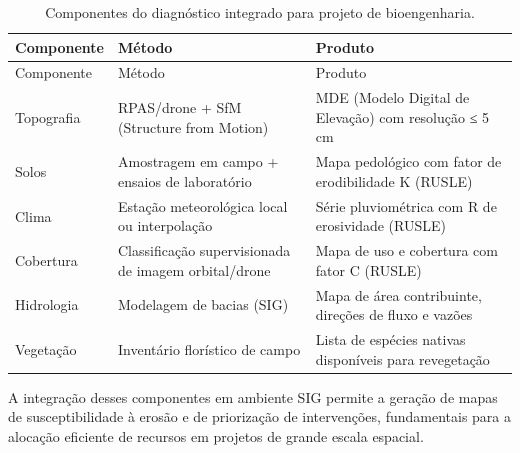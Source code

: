 \documentclass[
  portuguese,
  11pt,
  a4paper,
  open=any]{scrbook}
\begin{document}
\begin{longtable}[]{@{}
  >{\raggedright\arraybackslash}p{}
  >{\raggedright\arraybackslash}p{}
  >{\raggedright\arraybackslash}p{}@{}}
\caption{Componentes do diagnóstico integrado para projeto de
bioengenharia.}\label{tbl-diagnostico}\tabularnewline
\toprule\noalign{}
\begin{minipage}[b]{\linewidth}\raggedright
Componente
\end{minipage} & \begin{minipage}[b]{\linewidth}\raggedright
Método
\end{minipage} & \begin{minipage}[b]{\linewidth}\raggedright
Produto
\end{minipage} \\
\midrule\noalign{}
\endfirsthead
\toprule\noalign{}
\begin{minipage}[b]{\linewidth}\raggedright
Componente
\end{minipage} & \begin{minipage}[b]{\linewidth}\raggedright
Método
\end{minipage} & \begin{minipage}[b]{\linewidth}\raggedright
Produto
\end{minipage} \\
\midrule\noalign{}
\endhead
\bottomrule\noalign{}
\endlastfoot
Topografia & RPAS/drone + SfM (Structure from Motion) & MDE (Modelo
Digital de Elevação) com resolução ≤ 5 cm \\
Solos & Amostragem em campo + ensaios de laboratório & Mapa pedológico
com fator de erodibilidade K (RUSLE) \\
Clima & Estação meteorológica local ou interpolação & Série
pluviométrica com R de erosividade (RUSLE) \\
Cobertura & Classificação supervisionada de imagem orbital/drone & Mapa
de uso e cobertura com fator C (RUSLE) \\
Hidrologia & Modelagem de bacias (SIG) & Mapa de área contribuinte,
direções de fluxo e vazões \\
Vegetação & Inventário florístico de campo & Lista de espécies nativas
disponíveis para revegetação \\
\end{longtable}

A integração desses componentes em ambiente SIG permite a geração de
mapas de susceptibilidade à erosão e de priorização de intervenções,
fundamentais para a alocação eficiente de recursos em projetos de grande
escala espacial.
\end{document}

